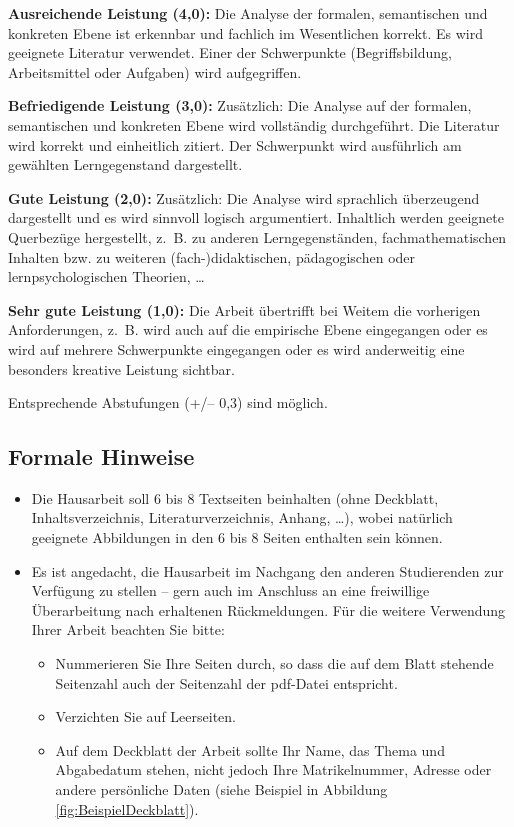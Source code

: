 \documentclass[
  ngerman,
]{scrbook}
\providecommand{\tightlist}{%
  \setlength{\itemsep}{0pt}\setlength{\parskip}{0pt}}
\theoremstyle{definition}
\theoremstyle{definition}
\theoremstyle{definition}
\theoremstyle{definition}
\theoremstyle{remark}
\begin{document}
\textbf{Ausreichende Leistung (4,0):} Die Analyse der formalen, semantischen und konkreten Ebene ist erkennbar und fachlich im Wesentlichen korrekt. Es wird geeignete Literatur verwendet. Einer der Schwerpunkte (Begriffsbildung, Arbeitsmittel oder Aufgaben) wird aufgegriffen.

\textbf{Befriedigende Leistung (3,0):} Zusätzlich: Die Analyse auf der formalen, semantischen und konkreten Ebene wird vollständig durchgeführt. Die Literatur wird korrekt und einheitlich zitiert. Der Schwerpunkt wird ausführlich am gewählten Lerngegenstand dargestellt.

\textbf{Gute Leistung (2,0):} Zusätzlich: Die Analyse wird sprachlich überzeugend dargestellt und es wird sinnvoll logisch argumentiert. Inhaltlich werden geeignete Querbezüge hergestellt, z.~B. zu anderen Lerngegenständen, fachmathematischen Inhalten bzw. zu weiteren (fach-)didaktischen, pädagogischen oder lernpsychologischen Theorien, \ldots{}

\textbf{Sehr gute Leistung (1,0):} Die Arbeit übertrifft bei Weitem die vorherigen Anforderungen, z.~B. wird auch auf die empirische Ebene eingegangen oder es wird auf mehrere Schwerpunkte eingegangen oder es wird anderweitig eine besonders kreative Leistung sichtbar.

Entsprechende Abstufungen (+/-- 0,3) sind möglich.

\hypertarget{formale-hinweise}{%
\subsection{Formale Hinweise}\label{formale-hinweise}}

\begin{itemize}
\tightlist
\item
  Die Hausarbeit soll 6 bis 8 Textseiten beinhalten (ohne Deckblatt, Inhaltsverzeichnis, Literaturverzeichnis, Anhang, \ldots), wobei natürlich geeignete Abbildungen in den 6 bis 8 Seiten enthalten sein können.
\item
  Es ist angedacht, die Hausarbeit im Nachgang den anderen Studierenden zur Verfügung zu stellen -- gern auch im Anschluss an eine freiwillige Überarbeitung nach erhaltenen Rückmeldungen. Für die weitere Verwendung Ihrer Arbeit beachten Sie bitte:

  \begin{itemize}
  \tightlist
  \item
    Nummerieren Sie Ihre Seiten durch, so dass die auf dem Blatt stehende Seitenzahl auch der Seitenzahl der pdf-Datei entspricht.
  \item
    Verzichten Sie auf Leerseiten.
  \item
    Auf dem Deckblatt der Arbeit sollte Ihr Name, das Thema und Abgabedatum stehen, nicht jedoch Ihre Matrikelnummer, Adresse oder andere persönliche Daten (siehe Beispiel in Abbildung \ref{fig:BeispielDeckblatt}).
  \end{itemize}
\end{itemize}
\end{document}
